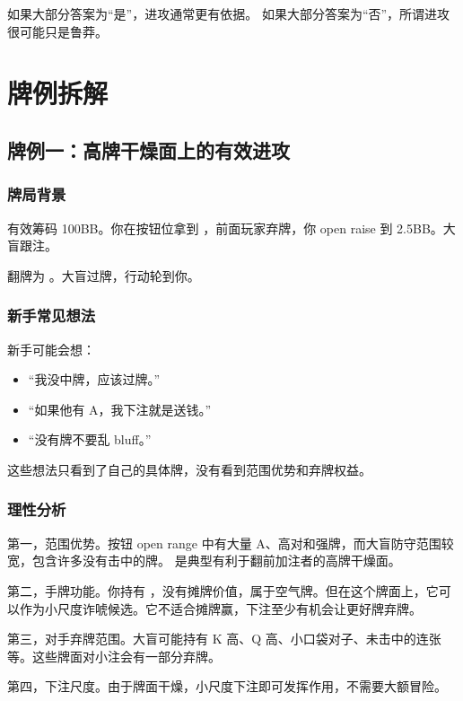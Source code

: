 如果大部分答案为“是”，进攻通常更有依据。
如果大部分答案为“否”，所谓进攻很可能只是鲁莽。

\section{牌例拆解}

\subsection{牌例一：高牌干燥面上的有效进攻}

\subsubsection*{牌局背景}

有效筹码 100BB。你在按钮位拿到 ，前面玩家弃牌，你 open raise 到 2.5BB。大盲跟注。

翻牌为 。大盲过牌，行动轮到你。

\subsubsection*{新手常见想法}

新手可能会想：

\begin{itemize}
\item “我没中牌，应该过牌。”
\item “如果他有 A，我下注就是送钱。”
\item “没有牌不要乱 bluff。”
\end{itemize}

这些想法只看到了自己的具体牌，没有看到范围优势和弃牌权益。

\subsubsection*{理性分析}

第一，范围优势。按钮 open range 中有大量 A、高对和强牌，而大盲防守范围较宽，包含许多没有击中的牌。 是典型有利于翻前加注者的高牌干燥面。

第二，手牌功能。你持有 ，没有摊牌价值，属于空气牌。但在这个牌面上，它可以作为小尺度诈唬候选。它不适合摊牌赢，下注至少有机会让更好牌弃牌。

第三，对手弃牌范围。大盲可能持有 K 高、Q 高、小口袋对子、未击中的连张等。这些牌面对小注会有一部分弃牌。

第四，下注尺度。由于牌面干燥，小尺度下注即可发挥作用，不需要大额冒险。

